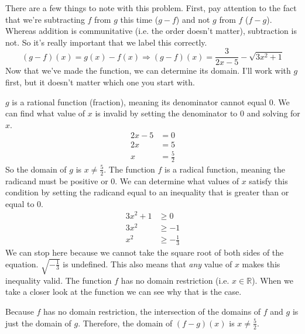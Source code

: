 \begin{solution}
    There are a few things to note with this problem. First, pay attention to the fact that we're subtracting $f$ from $g$ this time ($g - f$) and not $g$ from $f$ ($f - g$). Whereas addition is communitative (i.e. the order doesn't matter), subtraction is not. So it's really important that we label this correctly.
    \[
        (g - f)(x) = g(x) - f(x) \Longrightarrow (g - f)(x) = \frac{3}{2x - 5} - \sqrt{3x^2 + 1}
    \]
    Now that we've made the function, we can determine its domain. I'll work with $g$ first, but it doesn't matter which one you start with.

    $g$ is a rational function (fraction), meaning its denominator cannot equal $0$. We can find what value of $x$ is invalid by setting the denominator to $0$ and solving for $x$.
    \begin{align*}
        2x - 5 &= 0 \\
        2x &= 5 \\
        x &= \frac{5}{2}
    \end{align*}
    So the domain of $g$ is $x \neq \frac{5}{2}$.\clearpage
    The function $f$ is a radical function, meaning the radicand must be positive or $0$. We can determine what values of $x$ satisfy this condition by setting the radicand equal to an inequality that is greater than or equal to $0$.
    \begin{align*}
    3x^2 + 1 &\ge 0 \\
    3x^2 &\ge -1 \\
    x^2 &\ge -\frac{1}{3}
    \end{align*}
    We can stop here because we cannot take the square root of both sides of the equation. $\sqrt{-\frac{1}{3}}$ is undefined. This also means that \textit{any} value of $x$ makes this inequality valid. The function $f$ has no domain restriction (i.e. $x \in \mathbb{R}$). When we take a closer look at the function we can see why that is the case. 
    
    Because $f$ has no domain restriction, the intersection of the domains of $f$ and $g$ is just the domain of $g$. Therefore, the domain of $(f - g)(x)$ is $x \neq \frac{5}{2}$.
\end{solution}